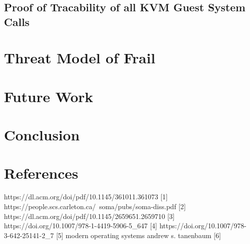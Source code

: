 \documentclass{report}
\begin{document}
\begin{spacing}{1.5}
\section{Proof of Tracability of all KVM Guest System Calls}

\chapter{Threat Model of Frail}


\chapter{Future Work}

\chapter{Conclusion}

\chapter{References}

{\large
https://dl.acm.org/doi/pdf/10.1145/361011.361073 [1]
https://people.scs.carleton.ca/~soma/pubs/soma-diss.pdf [2]
https://dl.acm.org/doi/pdf/10.1145/2659651.2659710 [3]
https://doi.org/10.1007/978-1-4419-5906-5\_647 [4]
https://doi.org/10.1007/978-3-642-25141-2\_7 [5]
modern operating systems andrew s. tanenbaum [6]
}
\end{spacing}
\end{document}
